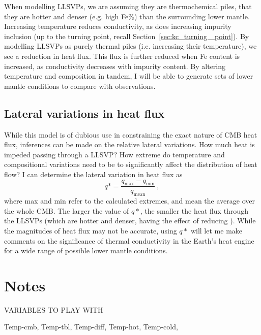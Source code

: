 When modelling LLSVPs, we are assuming they are thermochemical piles, that they are hotter and denser (e.g. high Fe\%) than the surrounding lower mantle. Increasing temperature reduces conductivity, as does increasing impurity inclusion (up to the turning point, recall Section~\ref{sec:kc_turning _point}). By modelling LLSVPs as purely thermal piles (i.e. increasing their temperature), we see a reduction in heat flux. This flux is further reduced when Fe content is increased, as conductivity decreases with impurity content. By altering temperature and composition in tandem, I will be able to generate sets of lower mantle conditions to compare with observations.



\subsection{Lateral variations in heat flux}

While this model is of dubious use in constraining the exact nature of CMB heat flux, inferences can be made on the relative lateral variations. How much heat is impeded passing through a LLSVP? How extreme do temperature and compositional variations need to be to significantly affect the distribution of heat flow? I can determine the lateral variation in heat flux as
%
\begin{equation}
\label{eq.q_star}
q* = \frac{q_{\mathrm{max}}-q_{\mathrm{min}}}{q_{\mathrm{mean}}}\ ,
\end{equation}
%
where max and min refer to the calculated extremes, and mean the average over the whole CMB. The larger the value of $q*$, the smaller the heat flux through the LLSVPs (which are hotter and denser, having the effect of reducing \tc). While the magnitudes of heat flux may not be accurate, using $q*$ will let me make comments on the significance of thermal conductivity in the Earth's heat engine for a wide range of possible lower mantle conditions.

\section{Notes}

VARIABLES TO PLAY WITH

Temp-cmb,
Temp-tbl,
Temp-diff,
Temp-hot,
Temp-cold,


